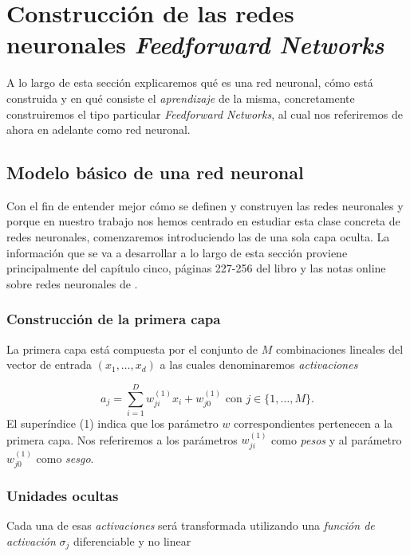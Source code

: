 %
\section{Construcción de las redes neuronales \textit{Feedforward Networks}} \label{sec:redes-neuronales-intro}

A lo largo de esta sección  explicaremos qué es una red neuronal, cómo está construida y en qué consiste el \textit{aprendizaje} de la misma, concretamente
construiremos el tipo particular \textit{Feedforward Networks}, al cual nos referiremos de ahora
en adelante como red neuronal.

\subsection{Modelo básico de una red neuronal} \label{rrnn:modelo_simple_rrnn}  

Con el fin de entender mejor cómo se definen y construyen las redes neuronales y porque en nuestro trabajo nos hemos centrado en estudiar
esta clase concreta de redes neuronales,
comenzaremos 
introduciendo las de una sola capa oculta. 
La información que se va a desarrollar a lo largo de esta 
sección proviene principalmente del capítulo cinco, páginas 227-256 del libro \cite{BishopPaterRecognition} y las notas online sobre redes neuronales de \cite{MostafaLearningFromData}.


\subsubsection*{Construcción de la primera capa}
La primera capa está compuesta por el conjunto de $M$ combinaciones
lineales del vector de entrada $(x_1, \ldots, x_d)$
a las cuales denominaremos \textit{activaciones}

\begin{equation}
    a_j = \sum_{i=1}^D w_{ji}^{(1)} x_i + w_{j0}^{(1)}
    \text{ con } j \in \{1, \ldots, M \}.
\end{equation}
El superíndice (1) indica que los parámetro $w$ correspondientes pertenecen a la primera capa. 
Nos referiremos a los  parámetros $w_{ji}^{(1)}$ como 
\textit{pesos} y al parámetro $w_{j0}^{(1)}$ como 
\textit{sesgo}.  

\subsubsection*{Unidades ocultas}
Cada una de esas \textit{activaciones} será transformada
utilizando una \textit{función de activación} $\sigma_j$ 
diferenciable y no linear

